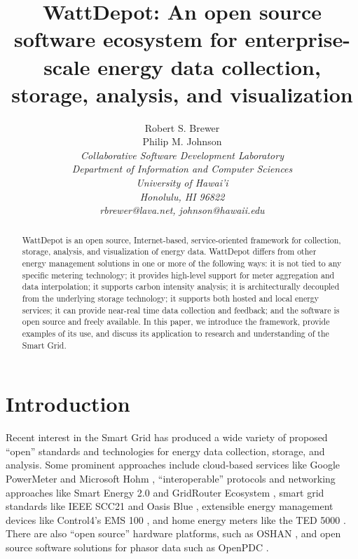 \documentclass[conference,compsoc]{IEEEtran}
\begin{document}
\title{WattDepot: An open source software ecosystem for enterprise-scale
  energy data collection, storage, analysis, and visualization}

\author{Robert S. Brewer\\
        Philip M. Johnson \\
\em     Collaborative Software Development Laboratory \\
        Department of Information and Computer Sciences \\
        University of Hawai'i \\
        Honolulu, HI 96822 \\
        rbrewer@lava.net, johnson@hawaii.edu \\
}


\maketitle

\begin{abstract}  %
  WattDepot is an open source, Internet-based, service-oriented framework 
  for collection, storage, analysis, and visualization of energy data.
  WattDepot differs from other energy management solutions in one or more
  of the following ways: it is not tied to any specific metering
  technology; it provides high-level support for meter aggregation and data
  interpolation; it supports carbon intensity analysis; it is
  architecturally decoupled from the underlying storage technology; it
  supports both hosted and local energy services; it can provide near-real
  time data collection and feedback; and the software is open source and
  freely available.  In this paper, we introduce the framework, provide
  examples of its use, and discuss its application to research and
  understanding of the Smart Grid.
\end{abstract}


\section{Introduction}
\label{sec:intro}

Recent interest in the Smart Grid has produced a wide variety of proposed
``open'' standards and technologies for energy data collection, storage,
and analysis.  Some prominent approaches include cloud-based services like
Google PowerMeter \cite{GooglePowerMeter} and Microsoft Hohm
\cite{MicrosoftHohm}, ``interoperable'' protocols and networking approaches
like Smart Energy 2.0 \cite{SmartEnergy2.0} and GridRouter Ecosystem
\cite{GridRouterEcosystem}, smart grid standards like IEEE SCC21
\cite{IEEESCC21} and Oasis Blue \cite{OasisBlue}, extensible energy
management devices like Control4's EMS 100 \cite{EMS100}, and home energy 
meters like the TED 5000 \cite{TED}.  There are also
``open source'' hardware platforms, such as OSHAN \cite{OSHAN}, and open
source software solutions for phasor data such as OpenPDC \cite{OpenPDC}.
\end{document}
